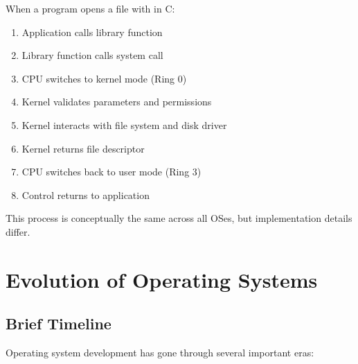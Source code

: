 \begin{examplebox}
When a program opens a file with  in C:

\begin{enumerate}
    \item Application calls library function 
    \item Library function calls system call 
    \item CPU switches to kernel mode (Ring 0)
    \item Kernel validates parameters and permissions
    \item Kernel interacts with file system and disk driver
    \item Kernel returns file descriptor
    \item CPU switches back to user mode (Ring 3)
    \item Control returns to application
\end{enumerate}

This process is conceptually the same across all OSes, but implementation details differ.
\end{examplebox}


\section{Evolution of Operating Systems}
\label{sec:os-history}

\subsection{Brief Timeline}

Operating system development has gone through several important eras:

